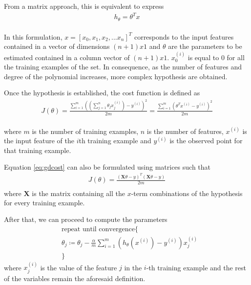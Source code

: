 \documentclass[a4paper, report, oneside, UKenglish]{memoir}
\begin{document}
From a matrix approach, this is equivalent to express
\begin{equation}\label{eq:gdHmatrix}
\begin{split}
    h_{\theta} = \theta^{T}x\\
\end{split}
\end{equation}

In this formulation, $x = [x_0,x_1, x_2,...x_n]^{T}$ corresponds to the input features contained in a vector of dimensions $(n+1)x1$ and $\theta$ are the parameters to be estimated contained in a column vector of $(n+1)x1$. $x_0^{(i)}$ is equal to 0 for all the training examples of the set. In consequence, as the number of features and degree of the polynomial increases, more complex hypothesis are obtained.  

Once the hypothesis is established, the cost function is defined as
\begin{equation}\label{eq:gdcost}
\begin{split}
    J(\theta) = \frac{\sum\limits_{i=1}^{m} ((\sum\limits_{j=1}^{n}\theta_{j}x_{j}^{(i)}) - y^{(i)})^{2}}{2m} = \frac{\sum\limits_{i=1}^{m}(\theta^{T}x^{(i)} - y^{(i)})^{2}}{2m}\\
\end{split}
\end{equation}

where $m$ is the number of training examples, $n$ is the number of features, $x^{(i)}$ is the input feature of the $i$th training example and $y^{(i)}$ is the observed point for that training example. 

Equation \eqref{eq:gdcost} can also be formulated using matrices such that
\begin{equation}\label{eq:gdcostmatrix}
\begin{split}
    J(\theta) = \frac{(\textbf{X}\theta - y)^{T}(\textbf{X}\theta - y)}{2m}\\
\end{split}
\end{equation}
where $\textbf{X}$ is the matrix containing all the $x$-term combinations of the hypothesis for every training example.

After that, we can proceed to compute the parameters
\begin{equation}\label{eq:gdtheta}
\begin{split}
    &\mbox{repeat until convergence}\{\\
    &\theta_{j} \coloneqq \theta_{j} - \frac{\alpha}{m} \sum\limits_{i=1}^{m}(h_{\theta}(x^{(i)}) -  y^{(i)})x_{j}^{(i)}\\
&\}
\end{split}
\end{equation}
where $x_{j}^{(i)}$ is the value of the feature $j$ in the $i$-th training example and the rest of the variables remain the aforesaid definition. 
\end{document}
